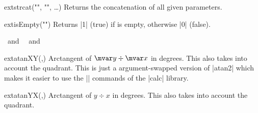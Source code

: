 \begin{multicols}{2}
\begin{math-function}{extstrcat("", "", …)}
\mathcommand
  Returns the concatenation of all given parameters.

\begin{codeexample}[]
\pgfmathresult
\end{codeexample}
\end{math-function}


\begin{math-function}{extisEmpty("")}
\mathcommand
  Returns |1| (true) if  is empty, otherwise |0| (false).
\begin{codeexample}[]
 \pgfmathresult\ and\ 
    \pgfmathresult\ and\ 
\def\emptyText{}
\pgfmathparse{extisEmpty("\emptyText")} \pgfmathresult
\end{codeexample}
\end{math-function}

\begin{math-function}{extatanXY(,)}
\mathcommand
  Arctangent of $\mvar y\div \mvar x$ in degrees. This also takes into account the quadrant.
  This is just a argument-swapped version of |atan2| which makes it easier to use
  the |\p| commands of the |calc|\indexLibraryO{calc} library.
\begin{codeexample}[]
 \pgfmathresult
\end{codeexample}
\end{math-function}
\begin{math-function}{extatanYX(,)}
\mathcommand
   Arctangent of $y\div x$ in degrees. This also takes into account the quadrant.
\begin{codeexample}[]
\pgfmathparse{extatanYX(4,3)} \pgfmathresult
\end{codeexample}
\end{math-function}


\end{multicols}
